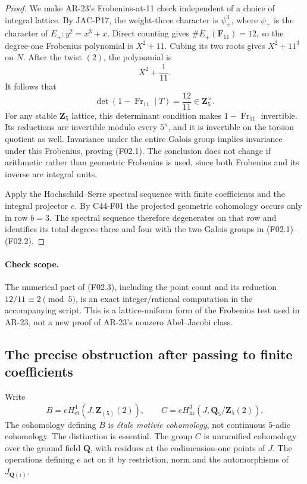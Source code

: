 \begin{proof}
We make AR-23's Frobenius-at-11 check independent of a choice of
integral lattice.  By JAC-P17, the weight-three character is
$\psi_+^3$, where $\psi_+$ is the character of
$E_+:y^2=x^3+x$.  Direct counting gives
$\#E_+(\mathbf F_{11})=12$, so the degree-one Frobenius
polynomial is $X^2+11$.  Cubing its two roots gives
$X^2+11^3$ on $N$.  After the twist $(2)$, the polynomial is
\[
                 X^2+\frac1{11}.
\]
It follows that
\[
       \det(1-\operatorname{Fr}_{11}\mid T)
              =\frac{12}{11}\in\mathbf Z_5^\times.
 \tag{F02.3}
\]
For any stable $\mathbf Z_5$ lattice, this determinant condition
makes $1-\operatorname{Fr}_{11}$ invertible.  Its reductions are
invertible modulo every $5^n$, and it is invertible on the torsion
quotient as well.  Invariance under the entire Galois group implies
invariance under this Frobenius, proving (F02.1).  The conclusion
does not change if arithmetic rather than geometric Frobenius is
used, since both Frobenius and its inverse are integral units.

Apply the Hochschild--Serre spectral sequence with finite
coefficients and the integral projector $e$.  By C44-F01 the
projected geometric cohomology occurs only in row $b=3$.
The spectral sequence therefore degenerates on that row and
identifies its total degrees three and four with the two Galois
groups in (F02.1)--(F02.2).
\end{proof}

\paragraph{Check scope.}
The numerical part of (F02.3), including the point count and its
reduction $12/11\equiv2\pmod5$, is an exact integer/rational
computation in the accompanying script.  This is a lattice-uniform
form of the Frobenius test used in AR-23, not a new proof of
AR-23's nonzero Abel--Jacobi class.

\subsection{The precise obstruction after passing to finite coefficients}

Write
\[
 B=eH^4_{\mathrm{et}}(J,\mathbf Z_{(5)}(2)),
 \qquad
 C=eH^3_{\mathrm{nr}}(J,\mathbf Q_5/\mathbf Z_5(2)).
 \tag{F03.1}
\]
The cohomology defining $B$ is \emph{\'etale motivic cohomology},
not continuous $5$-adic cohomology.  The distinction is essential.
The group $C$ is unramified cohomology over the ground field
$\mathbf Q$, with residues at the codimension-one points of $J$.
The operations defining $e$ act on it by restriction, norm and
the automorphisms of $J_{\mathbf Q(i)}$.

